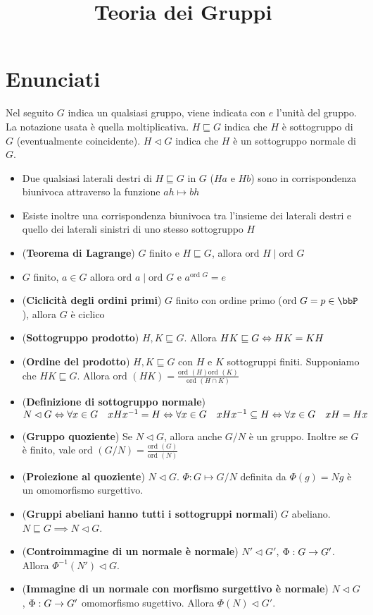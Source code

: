\documentclass[a4paper,NoNotes,GeneralMath]{stdmdoc}
\newcommand{\Ord}{\text{ord }}
\newcommand{\sgr}{\sqsubseteq}
\newcommand{\nrm}{\lhd}
\begin{document}
	\title{Teoria dei Gruppi}

	\section*{Enunciati}
	Nel seguito $G$ indica un qualsiasi gruppo, viene indicata con $e$ l'unità del gruppo. La notazione usata è quella moltiplicativa. $H \sgr G$ indica che $H$ è sottogruppo di $G$ (eventualmente coincidente). $H \nrm G$ indica che $H$ è un sottogruppo normale di $G$.
	\begin{itemize}
		\item Due qualsiasi laterali destri di $H \sgr G$ in $G$ ($Ha$ e $Hb$) sono in corrispondenza biunivoca attraverso la funzione $ah \mapsto bh$
		\item Esiste inoltre una corrispondenza biunivoca tra l'insieme dei laterali destri e quello dei laterali sinistri di uno stesso sottogruppo $H$
		\item ({\bf Teorema di Lagrange}) $G$ finito e $H \sgr G$, allora $\Ord H \mid \Ord G$
		\item $G$ finito, $a \in G$ allora $\Ord a \mid \Ord G$ e $a^{\Ord G} = e$
		\item ({\bf Ciclicità degli ordini primi}) $G$ finito con ordine primo ($\Ord G = p \in \bbP$), allora $G$ è ciclico
		\item ({\bf Sottogruppo prodotto}) $H, K \sgr G$. Allora $HK \sgr G \sse HK = KH$
		\item ({\bf Ordine del prodotto}) $H, K \sgr G$ con $H$ e $K$ sottogruppi finiti. Supponiamo che $HK \sgr G$. Allora $\Ord(HK) = \frac{\Ord(H)\Ord(K)}{\Ord(H\cap K)}$
		\item ({\bf Definizione di sottogruppo normale}) $N \nrm G \sse \forall x\in G \quad xHx^{-1} = H \sse \forall x \in G \quad xHx^{-1} \subseteq H \sse \forall x \in G \quad xH = Hx$
		\item ({\bf Gruppo quoziente}) Se $N \nrm G$, allora anche $G/N$ è un gruppo. Inoltre se $G$ è finito, vale $\Ord(G/N) = \frac{\Ord(G)}{\Ord(N)}$
		\item ({\bf Proiezione al quoziente}) $N \nrm G$. $\Phi: G \mapsto G/N$ definita da $\Phi(g) = Ng$ è un omomorfismo surgettivo.
		\item ({\bf Gruppi abeliani hanno tutti i sottogruppi normali}) $G$ abeliano. $N \sgr G \implies N \nrm G$.
		\item ({\bf Controimmagine di un normale è normale}) $N' \nrm G'$, $\Phi: G \rightarrow G'$. Allora $\Phi^{-1}(N') \nrm G$.
		\item ({\bf Immagine di un normale con morfismo surgettivo è normale}) $N \nrm G$, $\Phi: G \rightarrow G'$ omomorfismo sugettivo. Allora $\Phi(N) \nrm G'$.

\end{itemize}
\end{document}
